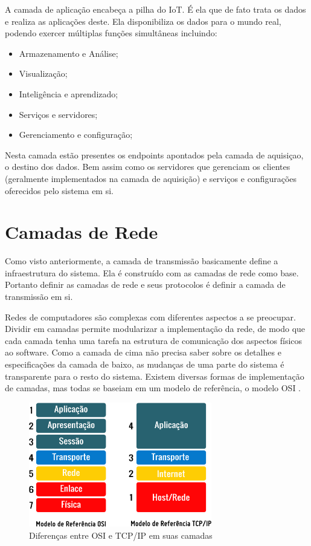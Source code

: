 A camada de aplicação encabeça a pilha do IoT. É ela que de fato trata os dados e realiza as aplicações deste. Ela disponibiliza os dados para o mundo real, podendo exercer múltiplas funções simultâneas incluindo:

\begin{itemize}
\item Armazenamento e Análise;
\item Visualização; 
\item Inteligência e aprendizado;
\item Serviços e servidores;
\item Gerenciamento e configuração;
\end{itemize}

Nesta camada estão presentes os endpoints apontados pela camada de aquisiçao, o destino dos dados. Bem assim como os servidores que gerenciam os clientes (geralmente implementados na camada de aquisição) e serviços e configurações oferecidos pelo sistema em si.

\section{Camadas de Rede}
\label{section:camadas_de_rede}

Como visto anteriormente, a camada de transmissão basicamente define a infraestrutura do sistema. Ela é construído com as camadas de rede como base. Portanto definir as camadas de rede e seus protocolos é definir a camada de transmissão em si.

Redes de computadores são complexas com diferentes aspectos a se preocupar. Dividir em camadas permite modularizar a implementação da rede, de modo que cada camada tenha uma tarefa na estrutura de comunicação dos aspectos físicos ao software. Como a camada de cima não precisa saber sobre os detalhes e especificações da camada de baixo, as mudanças de uma parte do sistema é transparente para o resto do sistema. Existem diversas formas de implementação de camadas, mas todas se baseiam em um modelo de referência, o modelo OSI \cite{Zimmermann:1988:ORM:59309.59310}.


\begin{figure}[h!]
\label{fig:1.2.0/modelo_osi_tcpip}
\centering
\includegraphics[width=8cm]{./02_Capitulos/02_Cap1/figures/modelo_osi_tcpip}
\caption{Diferenças entre OSI e TCP/IP em suas camadas}
\end{figure}

